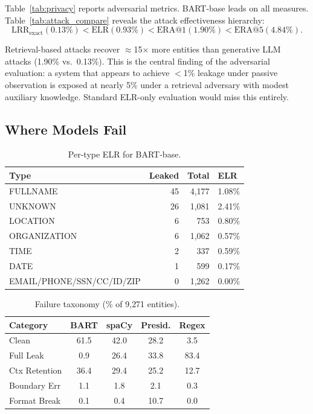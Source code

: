 \documentclass[10pt,twocolumn]{article}
\begin{document}
Table~\ref{tab:privacy} reports adversarial metrics.
BART-base leads on all measures.
Table~\ref{tab:attack_compare} reveals the attack effectiveness hierarchy:
\[
\text{LRR}_{\text{exact}} (0.13\%) < \text{ELR} (0.93\%) < \text{ERA@1} (1.90\%) < \text{ERA@5} (4.84\%).
\]

Retrieval-based attacks recover $\approx$15$\times$ more entities than generative LLM attacks (1.90\% vs.\ 0.13\%).
This is the central finding of the adversarial evaluation: a system that appears to achieve $<$1\% leakage under passive observation is exposed at nearly 5\% under a retrieval adversary with modest auxiliary knowledge.
Standard ELR-only evaluation would miss this entirely.

\subsection{Where Models Fail}\label{sec:res-fail}

\begin{table}[t]
\centering
\caption{Per-type ELR for BART-base.}\label{tab:pertype}
\small
\begin{tabular}{@{}lrrl@{}}
\toprule
Type & Leaked & Total & ELR \\
\midrule
FULLNAME & 45 & 4{,}177 & 1.08\% \\
UNKNOWN & 26 & 1{,}081 & 2.41\% \\
LOCATION & 6 & 753 & 0.80\% \\
ORGANIZATION & 6 & 1{,}062 & 0.57\% \\
TIME & 2 & 337 & 0.59\% \\
DATE & 1 & 599 & 0.17\% \\
EMAIL/PHONE/SSN/CC/ID/ZIP & 0 & 1{,}262 & 0.00\% \\
\bottomrule
\end{tabular}
\end{table}

\begin{table}[t]
\centering
\caption{Failure taxonomy (\% of 9{,}271 entities).}\label{tab:taxonomy}
\small
\begin{tabular}{@{}lcccc@{}}
\toprule
Category & BART & spaCy & Presid. & Regex \\
\midrule
Clean & 61.5 & 42.0 & 28.2 & 3.5 \\
Full Leak & 0.9 & 26.4 & 33.8 & 83.4 \\
Ctx Retention & 36.4 & 29.4 & 25.2 & 12.7 \\
Boundary Err & 1.1 & 1.8 & 2.1 & 0.3 \\
Format Break & 0.1 & 0.4 & 10.7 & 0.0 \\
\bottomrule
\end{tabular}
\end{table}
\end{document}

